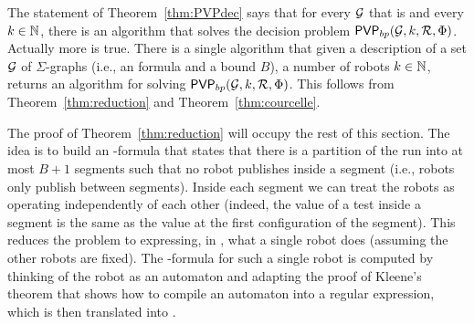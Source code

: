 \begin{remark}
The statement of Theorem~\ref{thm:PVPdec} says that for every $\mathcal{G}$ that is \courcellian and every $k \in \mathbb{N}$, there is an algorithm that solves 
the decision problem 
$\mathsf{PVP}_{bp}({\mathcal{G},k,\mathcal{R},\Phi})$. Actually more is true.  
 There is a single algorithm that given  a description of a \courcellian set $\mathcal{G}$ of $\Sigma$-graphs (i.e., an \msol formula and a bound $B$), a number of robots $k \in \mathbb{N}$, returns an algorithm for solving 
 $\mathsf{PVP}_{bp}({\mathcal{G},k,\mathcal{R},\Phi})$. This follows from Theorem~\ref{thm:reduction} and Theorem~\ref{thm:courcelle}.
\end{remark}

% 



The proof of Theorem~\ref{thm:reduction} will occupy the rest of this section. The idea is to build an \msol-formula that states that
there is a partition of the run into at most $B+1$ segments such that no robot publishes inside a segment (i.e., robots only publish between segments).
Inside each segment we can treat the robots as operating independently of each other (indeed, the value of a test inside a segment is the same as the value at the first configuration of the segment). This reduces the problem to expressing, in \msol, what a single robot does (assuming the other robots are fixed). The \msol-formula for such a single robot is computed by thinking of the robot as an automaton and adapting the proof of Kleene's theorem that shows how to compile an automaton into a regular expression, which is then translated into \msol. 

